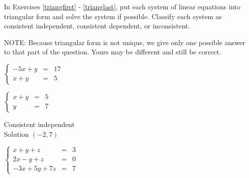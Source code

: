 \documentclass{ximera}
\begin{document}
	\author{Stitz-Zeager}



\label{ExercisesforLinSystems}

\begin{question}
In Exercises \ref{triangfirst} - \ref{trianglast}, put each system of linear equations into triangular form and solve the system if possible.  Classify each system as consistent independent, consistent dependent, or inconsistent.

NOTE:  Because triangular form is not unique, we give only one possible answer to that part of the question.  Yours may be different and still be correct.

\begin{problem}\label{triangfirst}
$\left\{ \begin{array}{rcr} -5x + y & = & 17  \\ x + y & = & 5  \end{array} \right.$ 




\begin{solution}
$\left\{ \begin{array}{rcr} x + y & = & 5  \\ y & = & 7  \end{array} \right.$ 

Consistent independent\\
Solution $(-2, 7)$
\end{solution}
\end{problem}

\begin{problem}
$\left\{ \begin{array}{rcr} x + y + z & = & 3 \\ 2x - y + z & = & 0 \\ -3x + 5y + 7z & = & 7  \end{array} \right.$


\end{problem}
\end{question}
\end{document}

